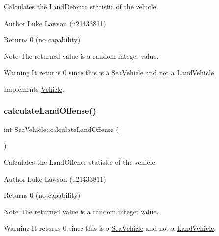 Calculates the Land\+Defence statistic of the vehicle. 

\begin{DoxyAuthor}{Author}
Luke Lawson (u21433811) 
\end{DoxyAuthor}
\begin{DoxyReturn}{Returns}
0 (no capability) 
\end{DoxyReturn}
\begin{DoxyNote}{Note}
The returned value is a random integer value. 
\end{DoxyNote}
\begin{DoxyWarning}{Warning}
It returns 0 since this is a \mbox{\hyperlink{class_sea_vehicle}{Sea\+Vehicle}} and not a \mbox{\hyperlink{class_land_vehicle}{Land\+Vehicle}}. 
\end{DoxyWarning}


Implements \mbox{\hyperlink{class_vehicle_a155724a3ab7689c7bafb970ad47ac0df}{Vehicle}}.

\mbox{\label{class_sea_vehicle_a6a07126cd3e346097f967e3a8038622f}} 
\subsubsection{\texorpdfstring{calculateLandOffense()}{calculateLandOffense()}}
{\footnotesize\ttfamily int Sea\+Vehicle\+::calculate\+Land\+Offense (\begin{DoxyParamCaption}{ }\end{DoxyParamCaption})\hspace{0.3cm}{\ttfamily [virtual]}}



Calculates the Land\+Offence statistic of the vehicle. 

\begin{DoxyAuthor}{Author}
Luke Lawson (u21433811) 
\end{DoxyAuthor}
\begin{DoxyReturn}{Returns}
0 (no capability) 
\end{DoxyReturn}
\begin{DoxyNote}{Note}
The returned value is a random integer value. 
\end{DoxyNote}
\begin{DoxyWarning}{Warning}
It returns 0 since this is a \mbox{\hyperlink{class_sea_vehicle}{Sea\+Vehicle}} and not a \mbox{\hyperlink{class_land_vehicle}{Land\+Vehicle}}. 
\end{DoxyWarning}


